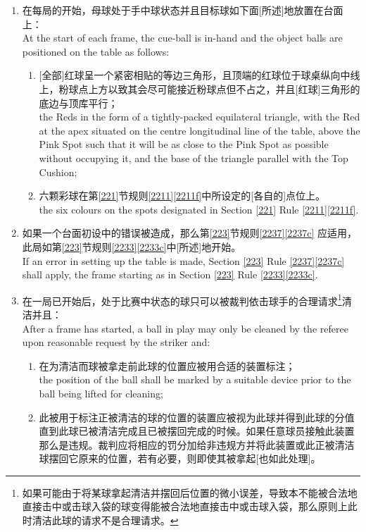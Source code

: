 \begin{enumerate}[label=(\alph*)]
    \item 在每局的开始，母球处于手中球状态并且目标球如下面[所述]地放置在台面上：\\
    At the start of each frame, the cue-ball is in-hand and the object balls are positioned on the table as follows:
    \begin{enumerate}[label=(\roman*)]
        \item ${}$[全部]红球呈一个紧密相贴的等边三角形，且顶端的红球位于球桌纵向中线上，粉球点上方以致其会尽可能接近粉球点但不占之，并且[红球]三角形的底边与顶库平行；\\
        the Reds in the form of a tightly-packed equilateral triangle, with the Red at the apex situated on the centre longitudinal line of the table, above the Pink Spot such that it will be as close to the Pink Spot as possible without occupying it, and the base of the triangle parallel with the Top Cushion;
        \item 六颗彩球在第\ref{221}节规则\ref{2211}\ref{2211f}中所设定的[各自的]点位上。\\
        the six colours on the spots designated in Section \ref{221} Rule \ref{2211}\ref{2211f}.
    \end{enumerate}
    \item 如果一个台面初设中的错误被造成，那么第\ref{223}节规则\ref{2237}\ref{2237c} 应适用，此局如第\ref{223}节规则\ref{2233}\ref{2233c}中[所述]地开始。\\
    If an error in setting up the table is made, Section \ref{223} Rule \ref{2237}\ref{2237c} shall apply, the frame starting as in Section \ref{223} Rule \ref{2233}\ref{2233c}.
    \item \label{2232c}在一局已开始后，处于比赛中状态的球只可以被裁判依击球手的合理请求\footnote{如果可能由于将某球拿起清洁并摆回后位置的微小误差，导致本不能被合法地直接击中或击球入袋的球变得能被合法地直接击中或击球入袋，那么原则上此时清洁此球的请求不是合理请求。}清洁并且：\\
    After a frame has started, a ball in play may only be cleaned by the referee upon reasonable request by the striker and:
    \begin{enumerate}[label=(\roman*)]
        \item 在为清洁而球被拿走前此球的位置应被用合适的装置标注；\\
        the position of the ball shall be marked by a suitable device prior to the ball being lifted for cleaning;
        \item \label{2232cii}此被用于标注正被清洁的球的位置的装置应被视为此球并得到此球的分值直到此球已被清洁完成且已被摆回完成的时候。如果任意球员接触此装置那么是违规。裁判应将相应的罚分加给非违规方并将此装置或此正被清洁球摆回它原来的位置，若有必要，则即使其被拿起[也如此处理]。\\

\end{enumerate}
\end{enumerate}
